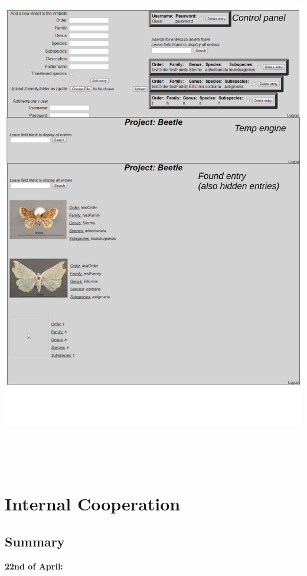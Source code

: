 \documentclass[12pt,a4paper]{article}
\begin{document}
\includegraphics[height=225mm]{UI3.pdf}


\newpage

\section{Internal Cooperation}
\subsection{Summary}

{\bf 22nd of April:}
\end{document}
